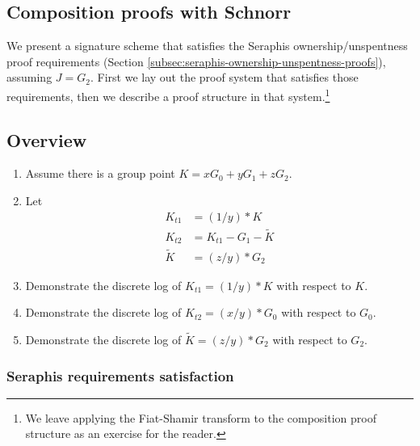 \begin{appendices}

\renewcommand{\theFancyVerbLine}{%
	\textcolor{red}{\small
		\arabic{FancyVerbLine}}}

\section{Composition proofs with Schnorr}
\label{appendix:composition-with-schnorr}

We present a signature scheme that satisfies the Seraphis ownership/unspentness proof requirements (Section \ref{subsec:seraphis-ownership-unspentness-proofs}), assuming $J = G_2$. First we lay out the proof system that satisfies those requirements, then we describe a proof structure in that system.\footnote{We leave applying the Fiat-Shamir transform \cite{fiat-shamir-transform} to the composition proof structure as an exercise for the reader.}


\subsection{Overview}
\label{appendix:composition-proof-overview}

\begin{enumerate}
    \item Assume there is a group point $K = x G_0 + y G_1 + z G_2$.

    \item Let
    \begin{align*}
        K_{t1} &= (1/y)*K \\
        K_{t2} &= K_{t1} - G_1 - \tilde{K} \\
        \tilde{K} &= (z/y)*G_2
    \end{align*}

    \item Demonstrate the discrete log of $K_{t1} = (1/y)*K$ with respect to $K$.

    \item Demonstrate the discrete log of $K_{t2} = (x/y)*G_0$ with respect to $G_0$.

    \item Demonstrate the discrete log of $\tilde{K} = (z/y)*G_2$ with respect to $G_2$.
\end{enumerate}

\subsubsection{Seraphis requirements satisfaction}


\end{appendices}

